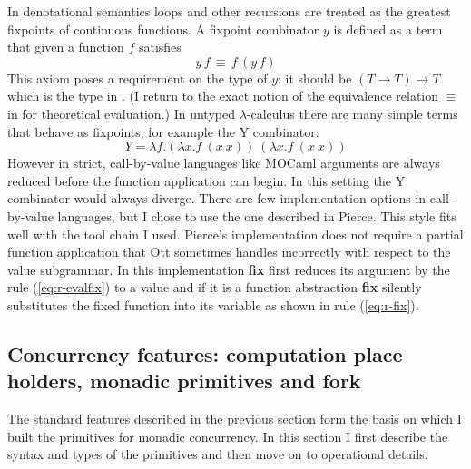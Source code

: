 \documentclass[12pt,twoside,notitlepage]{report}
\theoremstyle{plain}%
\theoremstyle{definition}
\theoremstyle{remark}
\begin{document}
In denotational semantics loops and other recursions are treated as the greatest fixpoints of continuous functions. A fixpoint combinator $ y $ is defined as a term that given a function $ f $ satisfies
\[ y\,f\,\equiv\, f\,(y\,f) \] 
This axiom poses a requirement on the type of $ y $: it should be $ (T \rightarrow T) \rightarrow T $ which is the type in . (I return to the exact notion of the equivalence relation $ \equiv $ in  for theoretical evaluation.)
In untyped $ \lambda $-calculus there are many simple terms that behave as fixpoints, for example the Y combinator:
\[ Y = \lambda f.(\lambda x.f\ (x\ x))\ (\lambda x.f\ (x\ x))  \]
However in strict, call-by-value languages like MOCaml arguments are always reduced before the function application can begin. In this setting the Y combinator would always diverge. There are few implementation options in call-by-value languages, but I chose to use the one described in Pierce\cite[p.~144]{pierce2002types}. This style fits well with the tool chain I used. Pierce's implementation does not require a partial function application that Ott sometimes handles incorrectly with respect to the value subgrammar. In this implementation \textbf{fix} first reduces its argument by the rule (\ref{eq:r-evalfix}) to a value and if it is a function abstraction \textbf{fix} silently substitutes the fixed function into its variable as shown in rule (\ref{eq:r-fix}).
\clearpage

\subsection{Concurrency features: computation place holders, monadic primitives and fork}
The standard features described in the previous section form the basis on which I built the primitives for monadic concurrency. In this section I first describe the syntax and types of the primitives and then move on to operational details.
\end{document}
